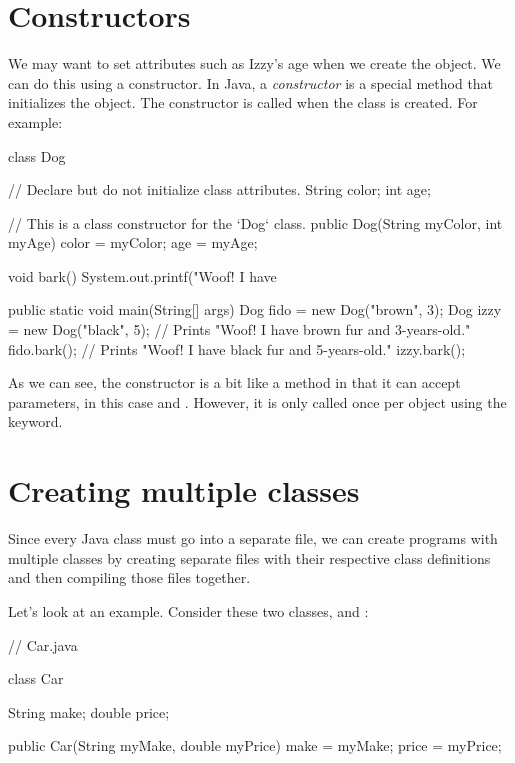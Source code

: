 \section{Constructors}

We may want to set attributes such as Izzy's age when we create the object. We can do this using a constructor. In Java, a \emph{constructor} is a special method that initializes the object. The constructor is called when the class is created. For example:

\begin{code}
class Dog {

    // Declare but do not initialize class attributes.
    String color;
    int age;
    
    // This is a class constructor for the `Dog` class.
    public Dog(String myColor, int myAge) {
        color = myColor;
        age = myAge;
    }
    
    void bark() {
        System.out.printf("Woof! I have %
    }
    
    public static void main(String[] args) {
        Dog fido = new Dog("brown", 3);
        Dog izzy = new Dog("black", 5);
        // Prints "Woof! I have brown fur and 3-years-old."
        fido.bark();
        // Prints "Woof! I have black fur and 5-years-old."
        izzy.bark();
    }
}
\end{code}

As we can see, the  constructor is a bit like a method in that it can accept parameters, in this case  and . However, it is only called once per object using the  keyword.

\section{Creating multiple classes}

Since every Java class must go into a separate file, we can create programs with multiple classes by creating separate files with their respective class definitions and then compiling those files together.

Let's look at an example. Consider these two classes,  and :

\begin{code}
// Car.java

class Car {
  
  String make;
  double price;
 
  public Car(String myMake, double myPrice) {
    make = myMake;
    price = myPrice;
  }
}
\end{code}

